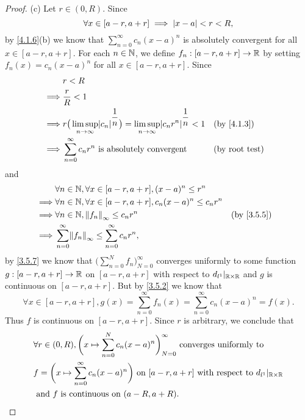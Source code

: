 \begin{proof}{(c)}
  Let \(r \in (0, R)\).
  Since
  \[
    \forall x \in [a - r, a + r] \implies \left\lvert x - a\right\rvert < r < R,
  \]
  by \cref{4.1.6}(b) we know that \(\sum_{n = 0}^\infty c_n (x - a)^n\) is absolutely convergent for all \(x \in [a - r, a + r]\).
  For each \(n \in \mathbb{N}\), we define \(f_n : [a - r, a + r] \to \mathbb{R}\) by setting \(f_n(x) = c_n (x - a)^n\) for all \(x \in [a - r, a + r]\).
  Since
  \begin{align*}
             & r < R                                                                                                                                            \\
    \implies & \dfrac{r}{R} < 1                                                                                                                                 \\
    \implies & r \big(\limsup_{n \to \infty} \abs{c_n}^{\dfrac{1}{n}}\big) = \limsup_{n \to \infty} \abs{c_n r^n}^{\dfrac{1}{n}} < 1 &  & \by{4.1.3}            \\
    \implies & \sum_{n = 0}^\infty c_n r^n \text{ is absolutely convergent}                                                          &  & \text{(by root test)}
  \end{align*}
  and
  \begin{align*}
             & \forall n \in \N, \forall x \in [a - r, a + r], (x - a)^n \leq r^n                         \\
    \implies & \forall n \in \N, \forall x \in [a - r, a + r], c_n (x - a)^n \leq c_n r^n                 \\
    \implies & \forall n \in \N, \norm*{f_n}_\infty \leq c_n r^n                          &  & \by{3.5.5} \\
    \implies & \sum_{n = 0}^\infty \norm*{f_n}_\infty \leq \sum_{n = 0}^\infty c_n r^n,
  \end{align*}
  by \cref{3.5.7} we know that \(\big(\sum_{n = 0}^N f_n\big)_{N = 0}^\infty\) converges uniformly to some function \(g : [a - r, a + r] \to \mathbb{R}\) on \([a - r, a + r]\) with respect to \(d_{l^1}|_{\mathbb{R} \times \mathbb{R}}\) and \(g\) is continuous on \([a - r, a + r]\).
  But by \cref{3.5.2} we know that
  \[
    \forall x \in [a - r, a + r], g(x) = \sum_{n = 0}^\infty f_n(x) = \sum_{n = 0}^\infty c_n (x - a)^n = f(x).
  \]
  Thus \(f\) is continuous on \([a - r, a + r]\).
  Since \(r\) is arbitrary, we conclude that
  \begin{align*}
     & \forall r \in (0, R), \bigg(x \mapsto \sum_{n = 0}^N c_n (x - a)^n\bigg)_{N = 0}^\infty \text{ converges uniformly to }                 \\
     & f = \bigg(x \mapsto \sum_{n = 0}^\infty c_n (x - a)^n\bigg) \text{ on } [a - r, a + r] \text{ with respect to } d_{l^1}|_{\mathbb{R} \times \mathbb{R}} \\
     & \text{ and } f \text{ is continuous on } (a - R, a + R).
  \end{align*}
\end{proof}

